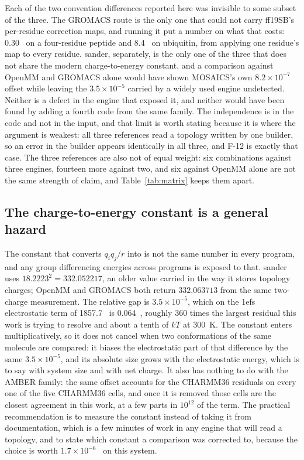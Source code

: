 Each of the two convention differences reported here was invisible to some
subset of the three. The GROMACS route is the only one that could not carry
ff19SB's per-residue correction maps, and running it put a number on what that
costs: 0.30~\kcal{} on a four-residue peptide and 8.4~\kcal{} on ubiquitin, from
applying one residue's map to every residue. sander, separately, is the only one
of the three that does not share the modern charge-to-energy constant, and a
comparison against OpenMM and GROMACS alone would have shown MOSAICS's own
$8.2\times10^{-7}$ offset while leaving the $3.5\times10^{-5}$ carried by a
widely used engine undetected. Neither is a defect in the engine that exposed
it, and neither would have been found by adding a fourth code from the same
family. The independence is in the code and not in the input, and that limit is
worth stating because it is where the argument is weakest: all three references
read a topology written by one builder, so an error in the builder appears
identically in all three, and F-12 is exactly that case. The three references
are also not of equal weight: six combinations against three engines, fourteen
more against two, and six against OpenMM alone are not the same strength of
claim, and Table~\ref{tab:matrix} keeps them apart.

\subsection{The charge-to-energy constant is a general hazard}
\label{sec:constantgeneral}

The constant that converts $q_iq_j/r$ into \kcal{} is not the same number in
every program, and any group differencing energies across programs is exposed
to that. sander uses $18.2223^2 = 332.052217$, an older value carried in the
way it stores topology charges; OpenMM and GROMACS both return $332.063713$
from the same two-charge measurement. The relative gap is $3.5\times10^{-5}$,
which on the 1efs electrostatic term of 1857.7~\kcal{} is 0.064~\kcal{}, roughly
360 times the largest residual this work is trying to resolve and about a tenth
of $kT$ at 300~K. The constant enters multiplicatively, so it does not cancel
when two conformations of the same molecule are compared: it biases the
electrostatic part of that difference by the same $3.5\times10^{-5}$, and its
absolute size grows with the electrostatic energy, which is to say with system
size and with net charge. It also has nothing to do with the AMBER family: the
same offset accounts for the CHARMM36 residuals on every one of the five
CHARMM36 cells, and once it is removed those cells are the closest agreement in
this work, at a few parts in $10^{12}$ of the term. The practical
recommendation is to measure the constant instead of taking it from
documentation, which is a few minutes of work in any engine that will read a
topology, and to state which constant a comparison was corrected to, because
the choice is worth $1.7\times10^{-6}$~\kcal{} on this system.

